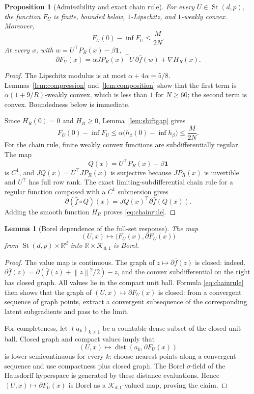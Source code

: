 \documentclass[11pt,a4paper]{article}
\newcommand{\R}{\mathbb{R}}
\newcommand{\one}{\mathbf 1}
\newcommand{\norm}[1]{\left\lVert #1\right\rVert}
\newcommand{\cK}{\mathcal K}
\DeclareMathOperator{\dist}{dist}
\newtheorem{proposition}[theorem]{Proposition}
\newtheorem{lemma}[theorem]{Lemma}
\theoremstyle{definition}
\numberwithin{equation}{section}
\newcommand{\St}{\operatorname{St}}
\begin{document}
\begin{proposition}[Admissibility and exact chain rule]\label{prop:admissible}
For every $U\in\St(d,p)$, the function $F_U$ is finite, bounded below, $1$-Lipschitz, and $1$-weakly convex.  Moreover,
\[
 F_U(0)-\inf F_U\le\frac{M}{2N}.
\]
At every $x$, with $w=U^\top P_R(x)-\beta\one$,
\begin{equation}\label{eq:chainrule}
 \partial F_U(x)
 =\alpha JP_R(x)^\top U\,\partial\bar f(w)+\nabla H_R(x).
\end{equation}
\end{proposition}

\begin{proof}
The Lipschitz modulus is at most $\alpha+4\alpha=5/8$.  Lemmas~\ref{lem:compression} and~\ref{lem:composition} show that the first term is $\alpha(1+9/R)$-weakly convex, which is less than $1$ for $N\ge60$; the second term is convex.  Boundedness below is immediate.

Since $H_R(0)=0$ and $H_R\ge0$, Lemma~\ref{lem:shiftgap} gives
\[
 F_U(0)-\inf F_U
 \le\alpha\bigl(h_\beta(0)-\inf h_\beta\bigr)
 \le\frac{M}{2N}.
\]
For the chain rule, finite weakly convex functions are subdifferentially regular.  The map
\[
 Q(x)=U^\top P_R(x)-\beta\one
\]
is $C^1$, and $JQ(x)=U^\top JP_R(x)$ is surjective because $JP_R(x)$ is invertible and $U^\top$ has full row rank.  The exact limiting-subdifferential chain rule for a regular function composed with a $C^1$ submersion gives
\[
 \partial(\bar f\circ Q)(x)=JQ(x)^\top\partial\bar f(Q(x)).
\]
Adding the smooth function $H_R$ proves \eqref{eq:chainrule}.
\end{proof}

\begin{lemma}[Borel dependence of the full-set response]\label{lem:response-borel}
The map
\[
 (U,x)\longmapsto \bigl(F_U(x),\partial F_U(x)\bigr)
\]
from $\St(d,p)\times\R^d$ into $\R\times\cK_{d,1}$ is Borel.
\end{lemma}

\begin{proof}
The value map is continuous.  The graph of $z\mapsto\partial\bar f(z)$ is closed: indeed,
$\partial\bar f(z)=\partial(\bar f(z)+\norm z^2/2)-z$, and the convex subdifferential on the right has closed graph.  All values lie in the compact unit ball.  Formula \eqref{eq:chainrule} then shows that the graph of $(U,x)\mapsto\partial F_U(x)$ is closed: from a convergent sequence of graph points, extract a convergent subsequence of the corresponding latent subgradients and pass to the limit.

For completeness, let $(a_k)_{k\ge1}$ be a countable dense subset of the closed unit ball.  Closed graph and compact values imply that
\[
 (U,x)\longmapsto \dist(a_k,\partial F_U(x))
\]
is lower semicontinuous for every $k$: choose nearest points along a convergent sequence and use compactness plus closed graph.  The Borel $\sigma$-field of the Hausdorff hyperspace is generated by these distance evaluations.  Hence $(U,x)\mapsto\partial F_U(x)$ is Borel as a $\cK_{d,1}$-valued map, proving the claim.
\end{proof}
\end{document}
